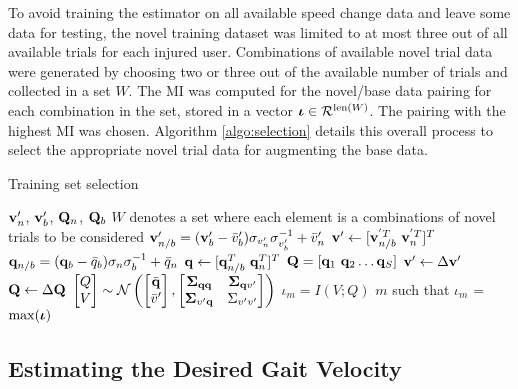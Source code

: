 To avoid training the estimator on all available speed change data and leave some data for testing, the novel training dataset was limited to at most three out of all available trials for each injured user. Combinations of available novel trial data were generated by choosing two or three out of the available number of trials and collected in a set $ W $. The MI was computed for the novel/base data pairing for each combination in the set, stored in a vector $ \boldsymbol{\iota} \in \mathcal{R}^{{\rm len}(W)}$. The pairing with the highest MI was chosen. Algorithm \ref{algo:selection} details this overall process to select the appropriate novel trial data for augmenting the base data.

\begin{algorithm}
	\caption{Training set selection}\label{algo:selection}
	\begin{algorithmic}[1]
		\Require $ \mathbf{v}'_n$, $\mathbf{v}'_b $, $ \mathbf{Q}_n $, $\mathbf{Q}_b$
		 $ W $ denotes a set where each element is a combinations of novel trials to be considered
		\State $ \mathbf{v}'_{n/b} = (\mathbf{v}'_b - \bar{v}'_b)\sigma_{v'_n} \sigma_{v'_b}^{-1} + \bar{v}'_n $ 
		\State $ \v' \leftarrow [\v_{n/b}^{'T}\ \v_{n}^{'T}]^T $
		\State $ \mathbf{q}_{n/b} = (\mathbf{q}_b - \bar{q}_b)\sigma_n \sigma_b^{-1} + \bar{q}_n $ 
		\State $ \mathbf{q} \leftarrow [\mathbf{q}_{n/b}^T\ \mathbf{q}_{n}^T]^T $
		\EndFor
		\State $ \mathbf{Q} = [\mathbf{q}_1 \ \mathbf{q}_2 \dots \mathbf{q}_S] $
		\State $ \mathbf{v}' \leftarrow \Delta \mathbf{v}' $
		\State $ \mathbf{Q} \leftarrow \Delta \mathbf{Q} $
		\vskip 5pt
		\State $ \begin{bmatrix}
			Q \\
			V
		\end{bmatrix} \sim \mathcal{N} \left( \begin{bmatrix}
			\bar{\mathbf{q}} \\
			\bar{v}'
		\end{bmatrix},\begin{bmatrix}
			\boldsymbol{\Sigma}_{\mathbf{q} \mathbf{q}} & \boldsymbol{\Sigma}_{\mathbf{q} v'} \\
			\boldsymbol{\Sigma}_{v' \mathbf{q}} & \Sigma_{v'v'}
		\end{bmatrix}\right) $
		\vskip 2pt
		\State $ \iota_m = I(V;Q) $
		\EndFor
		\State \Return $m$ such that $\iota_m$ = $ \max(\boldsymbol{\iota}) $ 
	\end{algorithmic}
\end{algorithm}%

\subsection{Estimating the Desired Gait Velocity}

